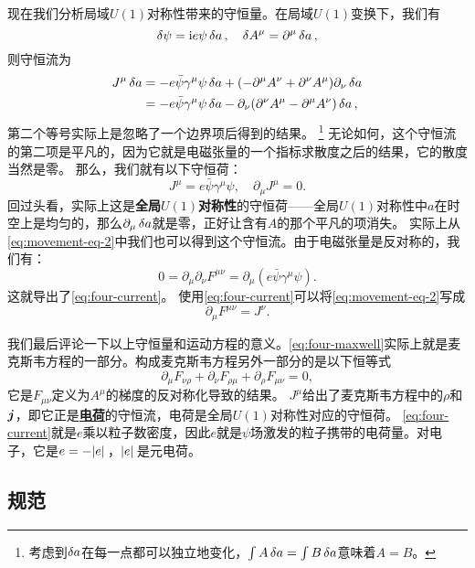 \documentclass[hyperref, UTF8, a4paper]{ctexart}
\newcommand*{\ii}{\mathrm{i}}
\newcommand{\concept}[1]{\underline{\textbf{#1}}}
\renewcommand{\emph}{\textbf}
\begin{document}
现在我们分析局域$U(1)$对称性带来的守恒量。在局域$U(1)$变换下，我们有
\[
    \var{\psi} = \ii e \psi \var{a}, \quad \var{A^\mu} = \partial^\mu \var{a},
\]
则守恒流为
\[
    \begin{aligned}
        J^\mu \var{a} &= - e \bar{\psi} \gamma^\mu \psi \var{a} + (-\partial^\mu A^\nu + \partial^\nu A^\mu) \partial_\nu \var{a} \\
        &= - e \bar{\psi} \gamma^\mu \psi \var{a} - \partial_\nu (\partial^\nu A^\mu - \partial^\mu A^\nu) \var{a},
    \end{aligned}
\]
第二个等号实际上是忽略了一个边界项后得到的结果。%
\footnote{考虑到$\var{a}$在每一点都可以独立地变化，$\int A\var{a} = \int B \var{a}$意味着$A=B$。}%
无论如何，这个守恒流的第二项是平凡的，因为它就是电磁张量的一个指标求散度之后的结果，它的散度当然是零。
那么，我们就有以下守恒荷：
\begin{equation}
    J^\mu = e \bar{\psi} \gamma^\mu \psi , \quad \partial_\mu J^\mu = 0.
    \label{eq:four-current}
\end{equation}
回过头看，实际上这是\emph{全局$U(1)$对称性}的守恒荷——全局$U(1)$对称性中$a$在时空上是均匀的，那么$\partial_\mu \var{a}$就是零，正好让含有$A$的那个平凡的项消失。
实际上从\eqref{eq:movement-eq-2}中我们也可以得到这个守恒流。由于电磁张量是反对称的，我们有：
\[
    0 = \partial_\mu \partial_\nu F^{\mu \nu} = \partial_\mu (e \bar{\psi} \gamma^\mu \psi).
\]
这就导出了\eqref{eq:four-current}。
使用\eqref{eq:four-current}可以将\eqref{eq:movement-eq-2}写成
\begin{equation}
    \partial_\mu F^{\mu \nu} = J^\nu.
    \label{eq:four-maxwell}
\end{equation}

我们最后评论一下以上守恒量和运动方程的意义。\eqref{eq:four-maxwell}实际上就是麦克斯韦方程的一部分。构成麦克斯韦方程另外一部分的是以下恒等式
\begin{equation}
    \partial_\mu F_{\nu \rho} + \partial_\nu F_{\rho \mu} + \partial_\rho F_{\mu \nu} = 0,
    \label{eq:bianchi-identity}
\end{equation}
它是$F_{\mu \nu}$定义为$A^\mu$的梯度的反对称化导致的结果。%
$J^\mu$给出了麦克斯韦方程中的$\rho$和$\vb*{j}$，即它正是\concept{电荷}的守恒流，电荷是全局$U(1)$对称性对应的守恒荷。
\eqref{eq:four-current}就是$e$乘以粒子数密度，因此$e$就是$\psi$场激发的粒子携带的电荷量。对电子，它是$e = -\abs*{e}$，$\abs*{e}$是元电荷。

\subsection{规范}\label{sec:gauge-def}
\end{document}
